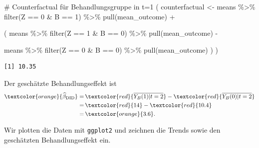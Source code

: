 \documentclass[
  a4paper,
  DIV=11,
  oneside]{scrreprt}
\newenvironment{Shaded}{\begin{snugshade}}{\end{snugshade}}
\newcommand{\CommentTok}[1]{\textcolor[rgb]{0.37,0.37,0.37}{#1}}
\newcommand{\DecValTok}[1]{\textcolor[rgb]{0.68,0.00,0.00}{#1}}
\newcommand{\FunctionTok}[1]{\textcolor[rgb]{0.28,0.35,0.67}{#1}}
\newcommand{\NormalTok}[1]{\textcolor[rgb]{0.00,0.23,0.31}{#1}}
\newcommand{\OtherTok}[1]{\textcolor[rgb]{0.00,0.23,0.31}{#1}}
\newcommand{\SpecialCharTok}[1]{\textcolor[rgb]{0.37,0.37,0.37}{#1}}
\begin{document}
\begin{Shaded}
\begin{Highlighting}[]
\CommentTok{\# Counterfactual für Behandlungsgruppe in t=1}
\NormalTok{(}
\NormalTok{  counterfactual }\OtherTok{\textless{}{-}}\NormalTok{ means }\SpecialCharTok{\%\textgreater{}\%}
  \FunctionTok{filter}\NormalTok{(Z }\SpecialCharTok{==} \DecValTok{0} \SpecialCharTok{\&}\NormalTok{ B }\SpecialCharTok{==} \DecValTok{1}\NormalTok{) }\SpecialCharTok{\%\textgreater{}\%}
  \FunctionTok{pull}\NormalTok{(mean\_outcome) }\SpecialCharTok{+}
  
\NormalTok{  (}
\NormalTok{    means }\SpecialCharTok{\%\textgreater{}\%}
     \FunctionTok{filter}\NormalTok{(Z }\SpecialCharTok{==} \DecValTok{1} \SpecialCharTok{\&}\NormalTok{ B }\SpecialCharTok{==} \DecValTok{0}\NormalTok{) }\SpecialCharTok{\%\textgreater{}\%}
     \FunctionTok{pull}\NormalTok{(mean\_outcome) }\SpecialCharTok{{-}}
   
\NormalTok{    means }\SpecialCharTok{\%\textgreater{}\%}
     \FunctionTok{filter}\NormalTok{(Z }\SpecialCharTok{==} \DecValTok{0} \SpecialCharTok{\&}\NormalTok{ B }\SpecialCharTok{==} \DecValTok{0}\NormalTok{) }\SpecialCharTok{\%\textgreater{}\%}
     \FunctionTok{pull}\NormalTok{(mean\_outcome)}
\NormalTok{   )}
\NormalTok{)}
\end{Highlighting}
\end{Shaded}

\begin{verbatim}
[1] 10.35
\end{verbatim}

Der geschätzte Behandlungseffekt ist \begin{align*}
\textcolor{orange}{\widehat{\beta}_\text{DID}} =&\, \textcolor{red}{\overline{Y_B(1)\vert t=2}} - \textcolor{red}{\overline{Y_B(0)\vert t=2}}\\
=&\,\textcolor{red}{14} - \textcolor{red}{10.4}\\
=&\, \textcolor{orange}{3.6}.
\end{align*}

Wir plotten die Daten mit \texttt{ggplot2} und zeichnen die Trends sowie
den geschätzten Behandlungseffekt ein.
\end{document}
